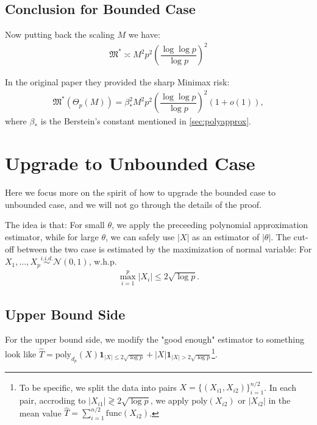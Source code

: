 \documentclass[11pt,a4paper]{article}
\numberwithin{equation}{section}%
\begin{document}
\subsection{Conclusion for Bounded Case}

Now putting back the scaling $ M $ we have:
\begin{align*}
    \mathfrak{M}^* \asymp M^2p^2\left( \dfrac{ \log\log p }{ \log p } \right) ^2 
\end{align*}

In the original paper \cite{cai2011testing} they provided the sharp Minimax risk:
\begin{align*}
    \mathfrak{M}^*(\Theta _p(M)) = \beta _*^2M^2p^2\left( \dfrac{ \log\log p }{ \log p } \right) ^2(1+o(1)),
\end{align*}
where $ \beta _* $ is the Berstein's constant  mentioned in \autoref{sec:polyapprox}.






\section{Upgrade to Unbounded Case}

Here we focus more on the spirit of how to upgrade the bounded case to unbounded case, and we will not go through the details of the proof.

The idea is that: For small $ \theta  $, we apply the preceeding polynomial approximation estimator, while for large $ \theta  $, we can safely use $ \left\vert X \right\vert  $ as an estimator of $ \left\vert \theta  \right\vert  $. The cut-off between the two case is estimated by the maximization of normal variable: For $ X_1,\ldots,X_p \mathop{ \sim }\limits^{i.i.d.}\mathcal{N}(0,1)  $, w.h.p.
\begin{align*}
     \max_{i=1}^p\left\vert X_i \right\vert  \leq 2\sqrt{\log p }.
\end{align*}

\subsection{Upper Bound Side}

For the upper bound side, we modify the "good enough" estimator to something look like $ \hat{T}= \mathrm{poly}_{d_p}(X)\mathbf{1}_{\left\vert X \right\vert \leq 2\sqrt{\log p}} + \left\vert X \right\vert \mathbf{1}_{\left\vert X \right\vert > 2\sqrt{\log p}}  $\footnote{To be specific, we split the data into pairs $ X=\{(X_{i1},X_{i2})\}_{i=1}^{n/2} $. In each pair, accroding to $ \left\vert X_{i1} \right\vert \gtrless  2\sqrt{\log p} $, we apply $ \mathrm{ poly }(X_{i2})  $ or $ \left\vert X_{i2} \right\vert  $ in the mean value $ \hat{T}=\sum_{i=1}^{n/2}\mathrm{ func }(X_{i2})  $. }. 
\end{document}
